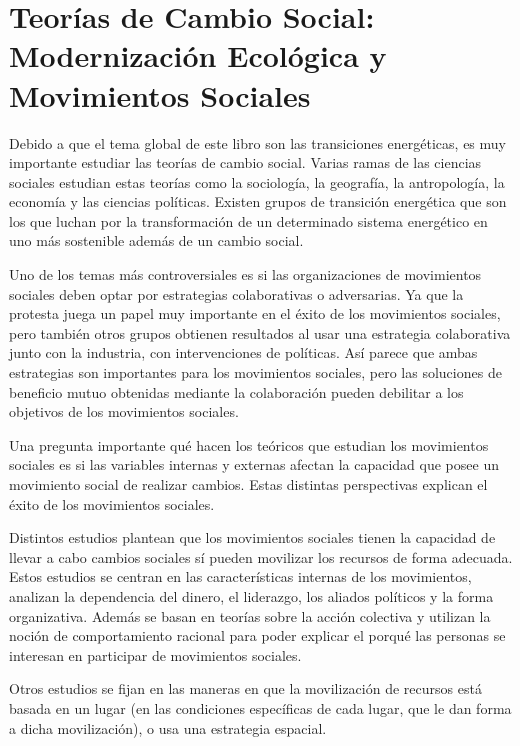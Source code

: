 \documentclass{article}
\begin{document}
\section{Teorías de Cambio Social: Modernización Ecológica y Movimientos Sociales}


Debido a que el tema global de este libro son las transiciones energéticas, es muy importante estudiar las teorías de cambio social. Varias ramas de las ciencias sociales estudian estas teorías como  la sociología, la geografía, la antropología, la economía y las ciencias políticas. Existen grupos de transición energética que son los que luchan por la transformación de un determinado sistema energético en uno más sostenible además de un cambio social. 

Uno de los temas más controversiales es si las organizaciones de movimientos sociales deben optar por estrategias colaborativas o adversarias. Ya que la protesta juega un papel muy importante en el éxito de los movimientos sociales, pero también otros grupos obtienen resultados al usar una estrategia colaborativa junto con la industria, con intervenciones de políticas. Así parece que ambas estrategias son importantes para los movimientos sociales, pero las soluciones de beneficio mutuo obtenidas mediante la colaboración pueden debilitar a los objetivos de los movimientos sociales.


Una pregunta importante qué hacen los teóricos que estudian los movimientos sociales es si las variables internas y externas afectan la capacidad que posee un movimiento social de realizar cambios. Estas distintas perspectivas explican el éxito de los movimientos sociales.


Distintos estudios plantean que los movimientos sociales tienen la capacidad de llevar a cabo cambios sociales sí pueden movilizar los recursos de forma adecuada. Estos estudios se centran en las características internas de los movimientos, analizan la dependencia del dinero, el liderazgo, los aliados políticos y la forma organizativa. Además se basan en teorías sobre la acción colectiva y utilizan la noción de comportamiento racional para poder explicar el porqué las personas se interesan en participar de movimientos sociales.

Otros estudios se fijan en las maneras en que la movilización de recursos está basada en un lugar (en las condiciones específicas de cada lugar, que le dan forma a dicha movilización), o usa una estrategia espacial.
\end{document}
